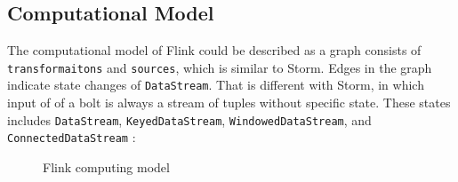  

\subsection{Computational Model}

The computational model of Flink could be described as a graph consists of \texttt{transformaitons} and \texttt{sources}, which is similar to Storm. Edges in the graph indicate state changes of \texttt{DataStream}. That is different with Storm, in which input of of a bolt is always a stream of tuples without specific state. These states includes \texttt{DataStream}, \texttt{KeyedDataStream}, \texttt{WindowedDataStream}, and \texttt{ConnectedDataStream} \cite{flink_model}:

\begin{figure}
  \begin{center}
   \caption{Flink computing model}
   \label{fig:flink_model}
  \end{center}
\end{figure}

